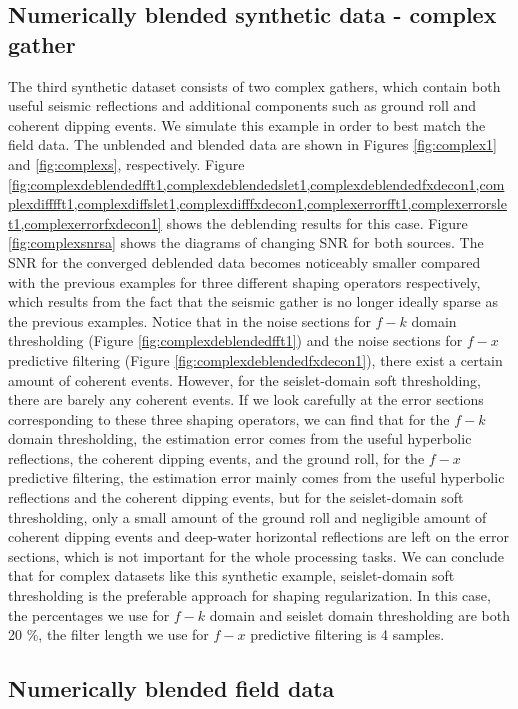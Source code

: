 \subsection{Numerically blended synthetic data - complex gather}
The third synthetic dataset consists of two complex gathers, which contain both useful seismic reflections and additional components such as ground roll and coherent dipping events. We simulate this example in order to best match the field data. The unblended and blended data are shown in Figures \ref{fig:complex1} and \ref{fig:complexs}, respectively. Figure \ref{fig:complexdeblendedfft1,complexdeblendedslet1,complexdeblendedfxdecon1,complexdifffft1,complexdiffslet1,complexdifffxdecon1,complexerrorfft1,complexerrorslet1,complexerrorfxdecon1}
shows the deblending results for this case. Figure \ref{fig:complexsnrsa} shows the diagrams of changing SNR for both sources. The SNR for the converged deblended data becomes noticeably smaller compared with the previous examples for three different shaping operators respectively, which results from the fact that the seismic gather is no longer ideally sparse as the previous examples. Notice that in the noise sections for $f-k$ domain thresholding (Figure \ref{fig:complexdeblendedfft1}) and the noise sections for $f-x$ predictive filtering (Figure \ref{fig:complexdeblendedfxdecon1}), there exist a certain amount of coherent events. However, for the seislet-domain soft thresholding, there are barely any coherent events. If we look carefully at the error sections corresponding to these three shaping operators, we can find that for the $f-k$ domain thresholding, the estimation error comes from the useful hyperbolic reflections, the coherent dipping events, and the ground roll, for the $f-x$ predictive filtering, the estimation error mainly comes from the useful hyperbolic reflections and the coherent dipping events, but for the seislet-domain soft thresholding, only a small amount of the ground roll and negligible amount of coherent dipping events and deep-water horizontal reflections are left on the error sections, which is not important for the whole processing tasks. We can conclude that for complex datasets like this synthetic example, seislet-domain soft thresholding is the preferable approach for shaping regularization.
In this case, the percentages we use for $f-k$ domain and seislet domain thresholding are both 20 \%, the filter length we use for $f-x$ predictive filtering is 4 samples. 

\subsection{Numerically blended field data }

